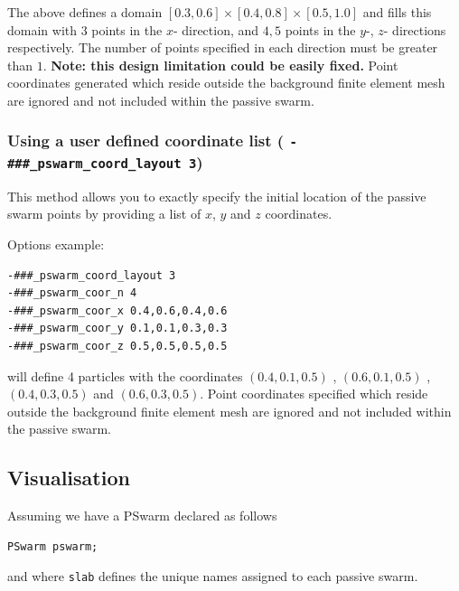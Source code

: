 \documentclass[paper=a4, fontsize=11pt,twoside]{scrartcl}
\begin{document}
{{The above defines a domain $[0.3,0.6] \times [0.4,0.8] \times [0.5,1.0]$ and fills this domain with $3$ points in the $x$- direction, and $4,5$ points in the $y$-, $z$- directions respectively. The number of points specified in each direction must be greater than $1$. 
\textbf{Note: this design limitation could be easily fixed.} 
Point coordinates generated which reside outside the background finite element mesh are ignored and not included within the passive swarm.

\subsubsection{Using a user defined coordinate list ( \texttt{-\#\#\#\_pswarm\_coord\_layout 3})}

This method allows you to exactly specify the initial location of the passive swarm points by providing
a list of $x$, $y$ and $z$ coordinates.

Options example:
\begin{lstlisting}
-###_pswarm_coord_layout 3
-###_pswarm_coor_n 4
-###_pswarm_coor_x 0.4,0.6,0.4,0.6
-###_pswarm_coor_y 0.1,0.1,0.3,0.3
-###_pswarm_coor_z 0.5,0.5,0.5,0.5
\end{lstlisting}
will define 4 particles with the coordinates $(0.4,0.1,0.5)$ , $(0.6,0.1,0.5)$ , $(0.4,0.3,0.5)$ and $(0.6,0.3,0.5)$.
Point coordinates specified which reside outside the background finite element mesh are ignored and not included within the passive swarm.

\subsection{Visualisation}

Assuming we have a PSwarm declared as follows
\begin{lstlisting}
PSwarm pswarm;
\end{lstlisting}
and where \texttt{slab} defines the unique names assigned to each passive swarm.

}}
\end{document}
